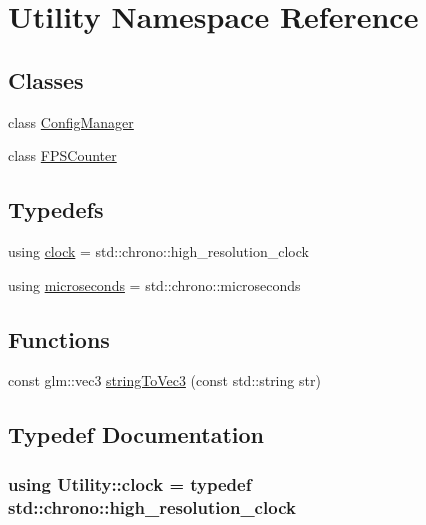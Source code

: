 \hypertarget{namespace_utility}{}\section{Utility Namespace Reference}
\label{namespace_utility}
\subsection*{Classes}
\begin{DoxyCompactItemize}
\item 
class \hyperlink{class_utility_1_1_config_manager}{Config\+Manager}
\item 
class \hyperlink{class_utility_1_1_f_p_s_counter}{F\+P\+S\+Counter}
\end{DoxyCompactItemize}
\subsection*{Typedefs}
\begin{DoxyCompactItemize}
\item 
using \hyperlink{namespace_utility_a92d943b48252a9ce2370ab0a5be3bf18}{clock} = std\+::chrono\+::high\+\_\+resolution\+\_\+clock
\item 
using \hyperlink{namespace_utility_a51dbcfa9fe1af2efd8482e726df61c50}{microseconds} = std\+::chrono\+::microseconds
\end{DoxyCompactItemize}
\subsection*{Functions}
\begin{DoxyCompactItemize}
\item 
const glm\+::vec3 \hyperlink{namespace_utility_a734225a4df22035f8028d7dcd49a6e5d}{string\+To\+Vec3} (const std\+::string str)
\end{DoxyCompactItemize}


\subsection{Typedef Documentation}
\hypertarget{namespace_utility_a92d943b48252a9ce2370ab0a5be3bf18}{}
\subsubsection[{clock}]{\setlength{\rightskip}{0pt plus 5cm}using {\bf Utility\+::clock} = typedef std\+::chrono\+::high\+\_\+resolution\+\_\+clock}\label{namespace_utility_a92d943b48252a9ce2370ab0a5be3bf18}
\hypertarget{namespace_utility_a51dbcfa9fe1af2efd8482e726df61c50}{}
